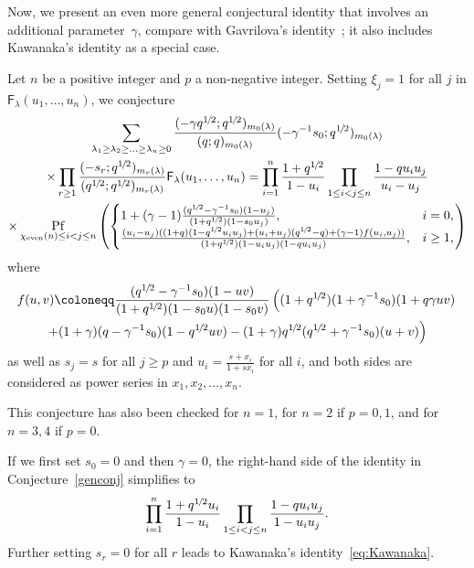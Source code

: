 \documentclass[ALCO, Unicode]{cedram}
\newcommand{\half}{1\mkern-2mu/\mkern-2mu2}
\DeclareMathOperator*{\pf}{Pf}
\newcommand{\F}{\mathsf{F}}
\begin{document}
	Now, we present an even more general conjectural identity that involves an additional parameter~$\gamma$, compare
	with Gavrilova's identity~\cite[(1)]{Gav23}; it also includes Kawanaka's identity as a special case.
	
	\begin{conj}
		\label{genconj}
		Let $n$ be a positive integer and $p$ a non-negative integer. Setting  
		$\xi_j=1$ for all $j$ in $\F_{\lambda}(u_1,\ldots,u_n)$, we conjecture
		\begin{multline*} 
			\sum_{\lambda_1 \ge \lambda_2 \ge \ldots \ge \lambda_n \ge 0} 
			\frac{(-\gamma q^{\half};q^{\half})_{m_0(\lambda)}}{(q;q)_{m_0(\lambda)}} (-\gamma^{-1}s_0;q^{\half})_{m_0(\lambda)}\\
			\times \prod_{r \ge 1} \frac{(-s_r;q^{\half})_{m_r(\lambda)}}{(q^{\half};q^{\half})_{m_r(\lambda)}}  \F_{\lambda}(u_1,\ldots,u_n)
			=  \prod_{i=1}^n \frac{1+q^{\half}}{1-u_i}
			\prod_{1 \le i < j \le n} \frac{1-q  u_i u_j}{u_i-u_j} \\
			\times 
			\pf_{\chi_{\mathrm{even}}(n) \le i < j \le n} \left(
			\begin{cases}
				1 + (\gamma-1) \frac{(q^{\half} - \gamma^{-1} s_0)(1-u_j)}{(1+q^{\half}) (1- s_0 u_j)}, & i=0,\\
				\frac{(u_i-u_j)((1+q)(1- q^{\half} u_i u_j) + (u_i + u_j)(q^{\half}- q)  +
					(\gamma-1) f(u_i,u_j))}{(1+q^{\half})(1- u_i u_j)(1- q u_i u_j)},& i\ge 1,
			\end{cases} \right) 
		\end{multline*}
		where 
		\begin{multline*} 
			f(u,v) \coloneqq 
			\frac{(q^{\half} - \gamma^{-1} s_0) (1-u v)}{(1+q^{\half})(1-s_0 u) (1-s_0 v)}
			\left( (1+ q^{\half})(1+ \gamma^{-1} s_0) (1 + q \gamma u v) \right. \\
			\left. +(1 + \gamma)(q - \gamma^{-1} s_0)(1 - q^{\half} u v) - (1 + \gamma) q^{\half} (q^{\half} + \gamma^{-1} s_0) (u + v) \right) 
		\end{multline*} 	
		as well as $s_j=s$ for all $j \ge p$ and  $u_i = \frac{s+x_i}{1 + s x_i}$ for all $i$, and both sides are considered as power series in $x_1,x_2,\ldots,x_n$.
	\end{conj}
	
	This conjecture has also been checked for $n=1$, for $n=2$ if $p=0,1$, and for $n=3,4$ if $p=0$.
	
	If we first set $s_0=0$ and then $\gamma=0$, the right-hand side of the identity in Conjecture~\ref{genconj} simplifies to 
	\begin{equation*}
		\prod_{i=1}^{n} \frac{1+q^{\half} u_i}{1-u_i} \prod_{1 \le i < j \le n} \frac{1-q u_i u_j}{1- u_i u_j}.
	\end{equation*}
	Further setting $s_r=0$ for all $r$ leads to Kawanaka's identity~\eqref{eq:Kawanaka}.
	
\end{document}

